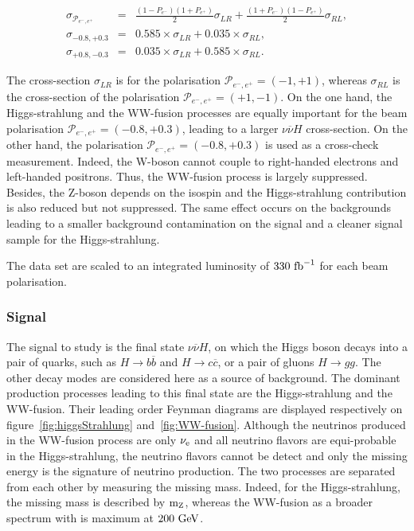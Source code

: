      \begin{equation}
       \begin{array}{lrc}
       \sigma_{\mathcal{P}_{e^-,e^+}} & = & \frac{(1 - P_{e^-})(1+P_{e^+})}{2} \sigma_{LR} + \frac{(1+P_{e^-})(1-P_{e^+})}{2} \sigma_{RL}, \\
       \sigma_{-0.8,+0.3} & = & 0.585 \times \sigma_{LR} + 0.035 \times \sigma_{RL}, \\
       \sigma_{+0.8,-0.3} & = & 0.035 \times \sigma_{LR} + 0.585 \times \sigma_{RL}.
       \end{array}
     \end{equation}

     The cross-section $\sigma_{LR}$ is for the polarisation $\mathcal{P}_{e^-,e^+} = (-1,+1)$, whereas $\sigma_{RL}$ is the cross-section of the polarisation $\mathcal{P}_{e^-,e^+} = (+1,-1)$.
     On the one hand, the Higgs-strahlung and the WW-fusion processes are equally important for the beam polarisation  $\mathcal{P}_{e^-,e^+} = (-0.8,+0.3)$, leading to a larger $\nu\overline{\nu} H$ cross-section.
     On the other hand, the polarisation $\mathcal{P}_{e^-,e^+} = (-0.8,+0.3)$ is used as a cross-check measurement.
     Indeed, the W-boson cannot couple to right-handed electrons and left-handed positrons.
     Thus, the WW-fusion process is largely suppressed.
     Besides, the Z-boson depends on the isospin and the Higgs-strahlung contribution is also reduced but not suppressed.
     The same effect occurs on the backgrounds leading to a smaller background contamination on the signal and a cleaner signal sample for the Higgs-strahlung.

     The data set are scaled to an integrated luminosity of $330~\rm{fb}^{-1}$ for each beam polarisation.

  \subsubsection{Signal}

    The signal to study is the final state $\nu\overline{\nu}H$, on which the Higgs boson decays into a pair of quarks, such as $H \rightarrow b\overline{b}$ and $H \rightarrow c\overline{c}$, or a pair of gluons $H \rightarrow gg$. 
    The other decay modes are considered here as a source of background. 
    The dominant production processes leading to this final state are the Higgs-strahlung and the WW-fusion.
    Their leading order Feynman diagrams are displayed respectively on figure~\ref{fig:higgsStrahlung} and~\ref{fig:WW-fusion}.
    Although the neutrinos produced in the WW-fusion process are only $\nu_{\rm{e}}$ and all neutrino flavors are equi-probable in the Higgs-strahlung, the neutrino flavors cannot be detect and only the missing energy is the signature of neutrino production.
    The two processes are separated from each other by measuring the missing mass.
    Indeed, for the Higgs-strahlung, the missing mass is described by $\rm{m_Z}$, whereas the WW-fusion as a broader spectrum with is maximum at $200~\rm{GeV}$.

